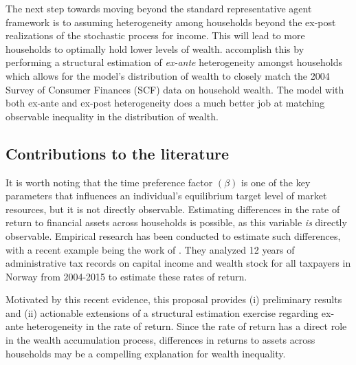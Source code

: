\documentclass[\econtexRoot/Chp1proposal]{subfiles}
\begin{document}
\par The next step towards moving beyond the standard representative agent framework is to assuming heterogeneity among households beyond the ex-post realizations of the stochastic process for income. This will lead to more households to optimally hold lower levels of wealth. \cite{cstw2017} accomplish this by performing a structural estimation of \textit{ex-ante} heterogeneity amongst households which allows for the model's distribution of wealth to closely match the 2004 Survey of Consumer Finances (SCF) data on household wealth. The model with both ex-ante and ex-post heterogeneity does a much better job at matching observable inequality in the distribution of wealth.


\subsection{Contributions to the literature}

\par It is worth noting that the time preference factor $(\beta)$ is one of the key parameters that influences an individual's equilibrium target level of market resources, but it is not directly observable. Estimating differences in the rate of return to financial assets across households is possible, as this variable \textit{is} directly observable. Empirical research has been conducted to estimate such differences, with a recent example being the work of \cite{aflgdmlp20}. They analyzed 12 years of administrative tax records on capital income and wealth stock for all taxpayers in Norway from 2004-2015 to estimate these rates of return.

\par Motivated by this recent evidence, this proposal provides (i) preliminary results and (ii) actionable extensions of a structural estimation exercise regarding ex-ante heterogeneity in the rate of return. Since the rate of return has a direct role in the wealth accumulation process, differences in returns to assets across households may be a compelling explanation for wealth inequality.

\onlyinsubfile{}

\end{document}
